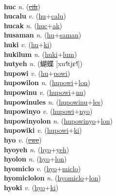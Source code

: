  \label{'humuhumunukunukuapua} \\
\textbf{huc} \textit{n.} (\hyperref[cih]{\sout{cih}})
 \label{huc} \\
\textbf{hucalu} \textit{v.} (\hyperref[hu]{hu}+\hyperref[calu]{calu})
 \label{hucalu} \\
\textbf{hucak} \textit{n.} (\hyperref[huc]{huc}+\hyperref[ak]{ak})
 \label{hucak} \\
\textbf{husaman} \textit{n.} (\hyperref[hu]{hu}+\hyperref[saman]{saman})
 \label{husaman} \\
\textbf{huki} \textit{v.} (\hyperref[hu]{hu}+\hyperref[ki]{ki})
 \label{huki} \\
\textbf{hukilum} \textit{n.} (\hyperref[huki]{huki}+\hyperref[lum]{lum})
 \label{hukilum} \\
\textbf{hutyeh} \textit{n.} ({\chinese{}蝴蝶} [xu˧˥tjɛ˧˥])
 \label{hutyeh} \\
\textbf{hupowi} \textit{v.} (\hyperref[hu]{hu}+\hyperref[powi]{powi})
 \label{hupowi} \\
\textbf{hupowilon} \textit{n.} (\hyperref[hupowi]{hupowi}+\hyperref[lon]{lon})
 \label{hupowilon} \\
\textbf{hupowinu} \textit{v.} (\hyperref[hupowi]{hupowi}+\hyperref[nu]{nu})
 \label{hupowinu} \\
\textbf{hupowinules} \textit{n.} (\hyperref[hupowinu]{hupowinu}+\hyperref[les]{les})
 \label{hupowinules} \\
\textbf{hupowinyo} \textit{v.} (\hyperref[hupowi]{hupowi}+\hyperref[nyo]{nyo})
 \label{hupowinyo} \\
\textbf{hupowinyolon} \textit{n.} (\hyperref[hupowinyo]{hupowinyo}+\hyperref[lon]{lon})
 \label{hupowinyolon} \\
\textbf{hupowiki} \textit{v.} (\hyperref[hupowi]{hupowi}+\hyperref[ki]{ki})
 \label{hupowiki} \\
\textbf{hyo} \textit{v.} (\hyperref[cwe]{\sout{cwe}})
 \label{hyo} \\
\textbf{hyoyeh} \textit{n.} (\hyperref[hyo]{hyo}+\hyperref[yeh]{yeh})
 \label{hyoyeh} \\
\textbf{hyolon} \textit{n.} (\hyperref[hyo]{hyo}+\hyperref[lon]{lon})
 \label{hyolon} \\
\textbf{hyomiclo} \textit{v.} (\hyperref[hyo]{hyo}+\hyperref[miclo]{miclo})
 \label{hyomiclo} \\
\textbf{hyomiclolon} \textit{n.} (\hyperref[hyomiclo]{hyomiclo}+\hyperref[lon]{lon})
 \label{hyomiclolon} \\
\textbf{hyoki} \textit{v.} (\hyperref[hyo]{hyo}+\hyperref[ki]{ki})
